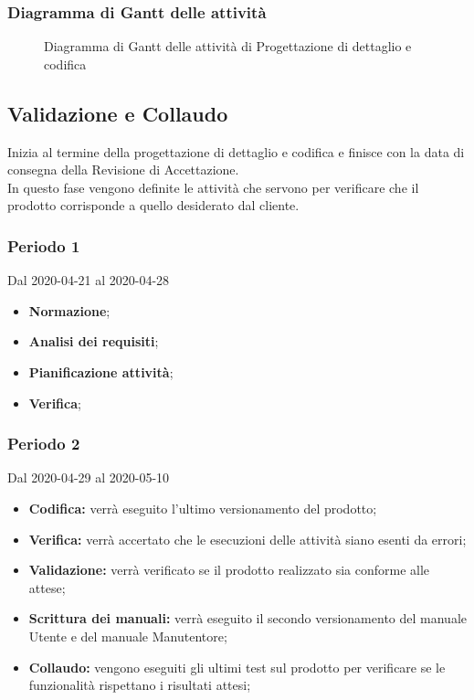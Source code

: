 \subsubsection{Diagramma di Gantt delle attività}
\begin{figure}[h]
	\caption{Diagramma di Gantt delle attività di Progettazione di dettaglio e codifica}
\end{figure}


\subsection{Validazione e Collaudo}
Inizia al termine della progettazione di dettaglio e codifica e finisce con la data di consegna della Revisione di Accettazione.
\\In questo fase vengono definite le attività che servono per verificare che il prodotto corrisponde a quello desiderato dal cliente.
\subsubsection{Periodo 1} 
Dal 2020-04-21 al 2020-04-28
\begin{itemize}
	\item \textbf{Normazione};
	\item \textbf{Analisi dei requisiti};
	\item \textbf{Pianificazione attività};
	\item \textbf{Verifica};
\end{itemize}
\subsubsection{Periodo 2} 
Dal 2020-04-29 al 2020-05-10
\begin{itemize}
	\item \textbf{Codifica:} verrà eseguito l'ultimo versionamento del prodotto;
	\item \textbf{Verifica:} verrà accertato che le esecuzioni delle attività siano esenti da errori;
	\item \textbf{Validazione:} verrà verificato se il prodotto realizzato sia conforme alle attese;
	\item \textbf{Scrittura dei manuali:} verrà eseguito il secondo versionamento del manuale Utente e del manuale Manutentore;
	\item \textbf{Collaudo:} vengono eseguiti gli ultimi test sul prodotto per verificare se le funzionalità rispettano i risultati attesi;
\end{itemize}
